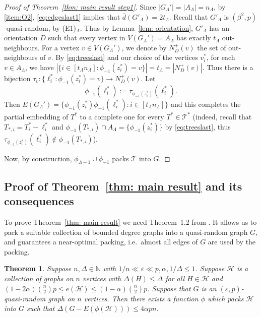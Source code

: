 \documentclass[a4paper, 11pt, reqno]{amsart}
\newtheorem{theorem}[definition]{Theorem}
\numberwithin{equation}{section}
\newcommand{\1}{{\rm 1\hspace*{-0.4ex}%
\rule{0.1ex}{1.52ex}\hspace*{0.2ex}}}
\newcommand{\N}{\mathbb N}
\newcommand{\cT}{\mathcal{T}}
\newcommand{\cH}{\mathcal{H}}
\renewcommand{\epsilon}{\varepsilon}
\newcounter{step}
\begin{document}
\begin{proof}[Proof of Theorem~\ref{thm: main result step1}]
Since $|G_\Lambda'|=|A_{\Lambda}|=n_\Lambda$, by \ref{item:O2},
\eqref{eq:edgeslast1} implies that $\overline{d}(G'_{\Lambda}) = 2t_{\Lambda}$. 
Recall that $G'_{\Lambda}$ is $(\beta^2,p)$-quasi-random, by (E1)$_\Lambda$.
Thus by Lemma~\ref{lem: orientation}, 
$G'_{\Lambda}$ has an orientation $D$ such that every vertex in $V(G_\Lambda')=A_{\Lambda}$ has exactly $t_{\Lambda}$ out-neighbours.
For a vertex $v\in V(G_\Lambda')$, we denote by $N_D^+(v)$ the set of out-neighbours of $v$.
By \eqref{eq:treeslast} and our choice of the vertices $v_i^*$,
for each $v\in A_{\Lambda}$, we have $|\{i\in [t_\Lambda n_\Lambda]: \phi_{-1}(z^*_i) = v\}|=t_{\Lambda}=|N^+_{D}(v)|$.
Thus there is a bijection  $\tau_v:\{\ell_i^*: \phi_{-1}(z^*_i) = v\}\to N^+_{D}(v)$.
Let 
$$\phi_{-1}(\ell^*_i):= \tau_{\phi_{-1}(z^*_i)}( \ell^*_i) .$$
Then $E(G_{\Lambda}') = \{ \phi_{-1}(z^*_i) \phi_{-1}(\ell^*_i) : i\in [t_{\Lambda}n_{\Lambda}]\}$ and 
this completes the partial embedding of $T^*$ to a complete one for every $T^*\in\cT^*$ 
(indeed, recall that $T_{*,i}=T_i^*-\ell^*_i$ and $\phi_{-1}(T_{*,i})\cap A_{\Lambda}=\{\phi_{-1}(z^*_i)\}$ by \eqref{eq:treeslast},
thus $\tau_{\phi_{-1}(z^*_i)}(\ell^*_i)\notin \phi_{-1}(T_{*,i})$).

Now, by construction, $\phi_{\Lambda-1}\cup \phi_{-1}$ packs $\cT$ into $G$.
\end{proof}


\subsection{Proof of Theorem~\ref{thm: main result} and its consequences}\label{sec:9.2}

To prove Theorem~\ref{thm: main result} we need Theorem~1.2 from \cite{KKOT16}. 
It allows us to pack a suitable collection of bounded degree graphs into a quasi-random graph $G$, and 
guarantees a near-optimal packing, i.e.~almost all edges of $G$ are used by the packing.

\begin{theorem} \label{thm: any graph packing}
Suppose $n,\Delta \in \N$ with $1/n \ll \epsilon \ll p, \alpha, 1/\Delta\leq 1$.
Suppose $\cH$ is a collection of graphs on $n$ vertices with $\Delta(H)\leq\Delta$ for all $H\in \cH$ and
$(1-2\alpha) \binom{n}{2}p \leq e(\cH) \leq (1-\alpha) \binom{n}{2}p$. Suppose that $G$ is an $(\epsilon,p)$-quasi-random graph on $n$ vertices.
Then there exists a function $\phi$ which packs $\cH$ into $G$ such that $\Delta(G - E(\phi(\cH)))\leq4\alpha p n$.
\end{theorem}
\end{document}
